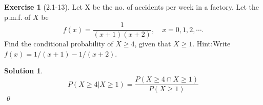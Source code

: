 \documentclass[14pt]{article}
\newtheorem*{solution}{Solution}
\theoremstyle{definition}
\newtheorem*{exercise}{Exercise}
\theoremstyle{remark}
\numberwithin{equation}{section}
\numberwithin{theorem}{section}
\begin{document}
\begin{exercise}[2.1-13]
    Let X be the no. of accidents per week in a factory. Let the p.m.f.
    of $X$ be
    $$
    f(x)=\frac{1}{(x+1)(x+2)},\quad x=0,1,2,\cdots.
    $$
    Find the conditional probability of $X\geq4$, given that $X\geq1$.
    Hint:Write $f(x)=1/(x+1)-1/(x+2)$.
\end{exercise}
\begin{solution}
    $$
    P(X\geq4|X\geq1)=\frac{P(X\geq4\cap X\geq1)}{P(X\geq1)}
    $$
    \qed
\end{solution}
\newpage



\nocite{*}
\end{document}

